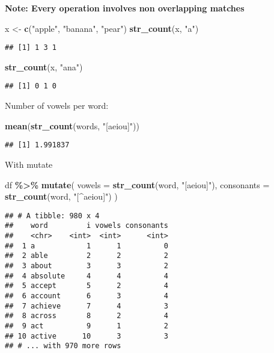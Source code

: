 \documentclass[
]{article}
\newenvironment{Shaded}{\begin{snugshade}}{\end{snugshade}}
\newcommand{\DataTypeTok}[1]{\textcolor[rgb]{0.13,0.29,0.53}{#1}}
\newcommand{\KeywordTok}[1]{\textcolor[rgb]{0.13,0.29,0.53}{\textbf{#1}}}
\newcommand{\NormalTok}[1]{#1}
\newcommand{\OperatorTok}[1]{\textcolor[rgb]{0.81,0.36,0.00}{\textbf{#1}}}
\newcommand{\StringTok}[1]{\textcolor[rgb]{0.31,0.60,0.02}{#1}}
\begin{document}
\textbf{Note: Every operation involves non overlapping matches}

\begin{Shaded}
\begin{Highlighting}[]
\NormalTok{x \textless{}{-}}\StringTok{ }\KeywordTok{c}\NormalTok{(}\StringTok{"apple"}\NormalTok{, }\StringTok{"banana"}\NormalTok{, }\StringTok{"pear"}\NormalTok{)}
\KeywordTok{str\_count}\NormalTok{(x, }\StringTok{"a"}\NormalTok{)}
\end{Highlighting}
\end{Shaded}

\begin{verbatim}
## [1] 1 3 1
\end{verbatim}

\begin{Shaded}
\begin{Highlighting}[]
\KeywordTok{str\_count}\NormalTok{(x, }\StringTok{"ana"}\NormalTok{)}
\end{Highlighting}
\end{Shaded}

\begin{verbatim}
## [1] 0 1 0
\end{verbatim}

Number of vowels per word:

\begin{Shaded}
\begin{Highlighting}[]
\KeywordTok{mean}\NormalTok{(}\KeywordTok{str\_count}\NormalTok{(words, }\StringTok{"[aeiou]"}\NormalTok{))}
\end{Highlighting}
\end{Shaded}

\begin{verbatim}
## [1] 1.991837
\end{verbatim}

With mutate

\begin{Shaded}
\begin{Highlighting}[]
\NormalTok{df }\OperatorTok{\%\textgreater{}\%}
\KeywordTok{mutate}\NormalTok{(}
\DataTypeTok{vowels =} \KeywordTok{str\_count}\NormalTok{(word, }\StringTok{"[aeiou]"}\NormalTok{),}
\DataTypeTok{consonants =} \KeywordTok{str\_count}\NormalTok{(word, }\StringTok{"[\^{}aeiou]"}\NormalTok{)}
\NormalTok{)}
\end{Highlighting}
\end{Shaded}

\begin{verbatim}
## # A tibble: 980 x 4
##    word         i vowels consonants
##    <chr>    <int>  <int>      <int>
##  1 a            1      1          0
##  2 able         2      2          2
##  3 about        3      3          2
##  4 absolute     4      4          4
##  5 accept       5      2          4
##  6 account      6      3          4
##  7 achieve      7      4          3
##  8 across       8      2          4
##  9 act          9      1          2
## 10 active      10      3          3
## # ... with 970 more rows
\end{verbatim}
\end{document}

